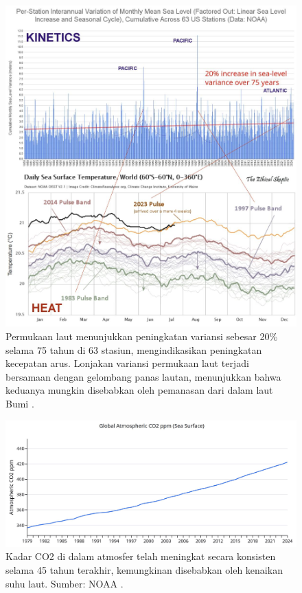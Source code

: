 \documentclass[10pt,twocolumn,letterpaper]{article}
\begin{document}
\begin{figure}[t]
\begin{center}
\includegraphics[width=1\textwidth]{sealevel.jpeg}
\end{center}
   \caption{Permukaan laut menunjukkan peningkatan variansi sebesar 20\% selama 75 tahun di 63 stasiun, mengindikasikan peningkatan kecepatan arus. Lonjakan variansi permukaan laut terjadi bersamaan dengan gelombang panas lautan, menunjukkan bahwa keduanya mungkin disebabkan oleh pemanasan dari dalam laut Bumi \cite{2,129}.}
\label{fig:22}
\end{figure}

\begin{figure}[t]
\begin{center}
\includegraphics[width=1\textwidth]{co2.jpg}
\end{center}
   \caption{Kadar CO2 di dalam atmosfer telah meningkat secara konsisten selama 45 tahun terakhir, kemungkinan disebabkan oleh kenaikan suhu laut. Sumber: NOAA \cite{148,129}.}
\label{fig:23}
\end{figure}
\end{document}
